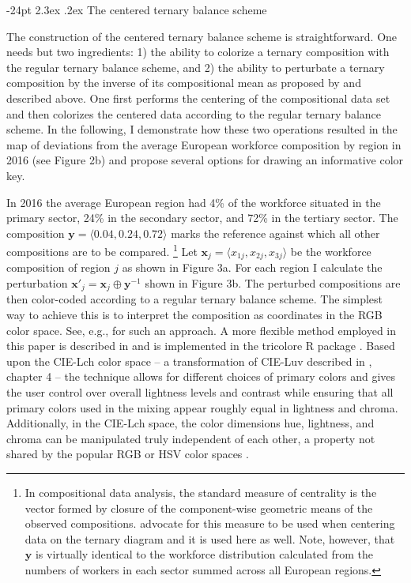 \documentclass[10pt,twoside,reqno]{article}
\makeatletter
\renewcommand\section{\@startsection {section}{1}{\z@}%
                                   {-24pt}%
                                   {2.3ex \@plus.2ex}%
                                   {\normalfont\large\bfseries}}
\let\oldfootnote\footnote
\renewcommand\footnote[1]{%
\oldfootnote{\hspace{0.6mm}#1}}
\makeatother
\begin{document}
\hypertarget{the-centered-ternary-balance-scheme}{%
\section{The centered ternary balance
scheme}\label{the-centered-ternary-balance-scheme}}

The construction of the centered ternary balance scheme is
straightforward. One needs but two ingredients: 1) the ability to
colorize a ternary composition with the regular ternary balance scheme,
and 2) the ability to perturbate a ternary composition by the inverse of
its compositional mean as proposed by \citet{VonEynatten2002} and
described above. One first performs the centering of the compositional
data set and then colorizes the centered data according to the regular
ternary balance scheme. In the following, I demonstrate how these two
operations resulted in the map of deviations from the average European
workforce composition by region in 2016 (see Figure 2b) and propose
several options for drawing an informative color key.

In 2016 the average European region had 4\% of the workforce situated in
the primary sector, 24\% in the secondary sector, and 72\% in the
tertiary sector. The composition
\(\mathbf{y}=\langle 0.04, 0.24, 0.72 \rangle\) marks the reference
against which all other compositions are to be compared.\footnote{ In
  compositional data analysis, the standard measure of centrality is the
  vector formed by closure of the component-wise geometric means of the
  observed compositions. \citet{VonEynatten2002} advocate for this
  measure to be used when centering data on the ternary diagram and it
  is used here as well. Note, however, that \(\mathbf{y}\) is virtually
  identical to the workforce distribution calculated from the numbers of
  workers in each sector summed across all European regions.} Let
\(\mathbf{x}_j = \langle x_{1j}, x_{2j}, x_{3j} \rangle\) be the
workforce composition of region \(j\) as shown in Figure 3a. For each
region I calculate the perturbation
\(\mathbf{x}'_j = \mathbf{x}_j \oplus \mathbf{y}^{-1}\) shown in Figure
3b. The perturbed compositions are then color-coded according to a
regular ternary balance scheme. The simplest way to achieve this is to
interpret the composition as coordinates in the RGB color space. See,
e.g., \citet{Wang2009} for such an approach. A more flexible method
employed in this paper is described in \citet{Schoeley2017} and is
implemented in the tricolore R package \citep{Schoeley2019a}. Based upon
the CIE-Lch color space -- a transformation of CIE-Luv described in
\citet{Ware2013}, chapter 4 -- the technique allows for different
choices of primary colors and gives the user control over overall
lightness levels and contrast while ensuring that all primary colors
used in the mixing appear roughly equal in lightness and chroma.
Additionally, in the CIE-Lch space, the color dimensions hue, lightness,
and chroma can be manipulated truly independent of each other, a
property not shared by the popular RGB or HSV color spaces
\citep{Zeileis2009}.
\end{document}
